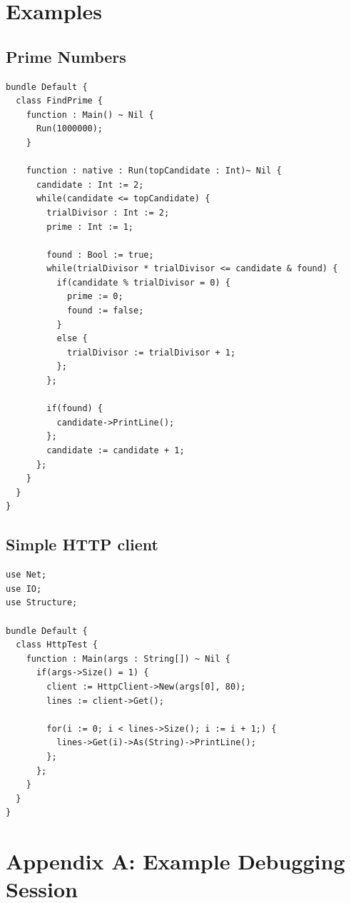\documentclass[12pt]{article}
\begin{document}
\section{Examples}
\subsection{Prime Numbers}
\begin{verbatim}
bundle Default {
  class FindPrime {
    function : Main() ~ Nil {
      Run(1000000);
    }

    function : native : Run(topCandidate : Int)~ Nil {
      candidate : Int := 2;
      while(candidate <= topCandidate) {
        trialDivisor : Int := 2;
        prime : Int := 1;

        found : Bool := true;
        while(trialDivisor * trialDivisor <= candidate & found) {
          if(candidate % trialDivisor = 0) {
            prime := 0;
            found := false;
          }
          else {
            trialDivisor := trialDivisor + 1;
          };
        };

        if(found) {
          candidate->PrintLine();
        };
        candidate := candidate + 1;
      };
    }
  }
}
\end{verbatim}

\subsection{Simple HTTP client}
\begin{verbatim}
use Net;
use IO;
use Structure;

bundle Default {
  class HttpTest {
    function : Main(args : String[]) ~ Nil {
      if(args->Size() = 1) {
        client := HttpClient->New(args[0], 80);
        lines := client->Get();

        for(i := 0; i < lines->Size(); i := i + 1;) {
          lines->Get(i)->As(String)->PrintLine();
        };
      };
    }
  }
}
\end{verbatim}
\newpage

\section{Appendix A: Example Debugging Session}
\end{document}

